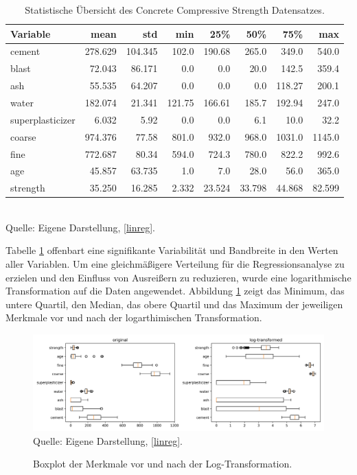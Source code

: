\begin{table}[!h]
    \caption{Statistische Übersicht des Concrete Compressive Strength Datensatzes.}
    \footnotesize
    \begin{tabularx}{\textwidth}{Xrrrrrrr}
    \toprule
    Variable & mean & std & min & 25\% & 50\% & 75\% & max \\
    \midrule
    cement & 278.629 & 104.345 & 102.0 & 190.68 & 265.0 & 349.0 & 540.0 \\
    blast & 72.043 & 86.171 & 0.0 & 0.0 & 20.0 & 142.5 & 359.4 \\
    ash & 55.535 & 64.207 & 0.0 & 0.0 & 0.0 & 118.27 & 200.1 \\
    water & 182.074 & 21.341 & 121.75 & 166.61 & 185.7 & 192.94 & 247.0 \\
    superplasticizer & 6.032 & 5.92 & 0.0 & 0.0 & 6.1 & 10.0 & 32.2 \\
    coarse & 974.376 & 77.58 & 801.0 & 932.0 & 968.0 & 1031.0 & 1145.0 \\
    fine & 772.687 & 80.34 & 594.0 & 724.3 & 780.0 & 822.2 & 992.6 \\
    age & 45.857 & 63.735 & 1.0 & 7.0 & 28.0 & 56.0 & 365.0 \\
    strength & 35.250 & 16.285 & 2.332 & 23.524 & 33.798 & 44.868 & 82.599 \\
    \bottomrule
    \end{tabularx}
    \label{tab:statistics}
    \normalsize
    \\ Quelle: Eigene Darstellung, \ref{linreg}.
\end{table}

Tabelle \ref{tab:statistics} offenbart eine signifikante Variabilität und Bandbreite 
in den Werten aller Variablen. Um eine gleichmäßigere Verteilung für die Regressionsanalyse 
zu erzielen und den Einfluss von Ausreißern zu reduzieren, wurde eine logarithmische Transformation 
auf die Daten angewendet. Abbildung \ref{pic:box} zeigt das Minimum, das untere Quartil, den Median, das obere Quartil und das Maximum
der jeweiligen Merkmale vor und nach der logarthimischen Transformation. 


\begin{figure}[!h]
    \caption{Boxplot der Merkmale vor und nach der Log-Transformation.}
    \includegraphics[width=1\textwidth]{../scripts/images/boxplot.png}
    Quelle: Eigene Darstellung, \ref{linreg}.
    \label{pic:box}
\end{figure}

